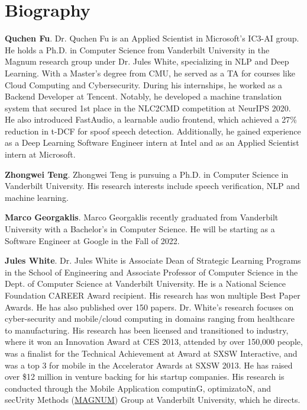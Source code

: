 \documentclass{river-journal}
\begin{document}
\nocite{*} \section*{Biography}


\medskip
\noindent
{\bf Quchen Fu}. Dr. Quchen Fu is an Applied Scientist in Microsoft's IC3-AI group. He holds a Ph.D. in Computer Science from Vanderbilt University in the Magnum research group under Dr. Jules White, specializing in NLP and Deep Learning. With a Master's degree from CMU, he served as a TA for courses like Cloud Computing and Cybersecurity. During his internships, he worked as a Backend Developer at Tencent. Notably, he developed a machine translation system that secured 1st place in the NLC2CMD competition at NeurIPS 2020. He also introduced FastAudio, a learnable audio frontend, which achieved a 27\% reduction in t-DCF for spoof speech detection. Additionally, he gained experience as a Deep Learning Software Engineer intern at Intel and as an Applied Scientist intern at Microsoft.



\medskip
\noindent
{\bf Zhongwei Teng}. Zhongwei Teng is pursuing a Ph.D. in Computer
Science in Vanderbilt University. His research interests
include speech verification, NLP and
machine learning.


\medskip
\noindent
{\bf Marco Georgaklis}. Marco Georgaklis recently graduated from Vanderbilt University with a Bachelor’s in Computer Science. He will be starting as a Software Engineer at Google in the Fall of 2022.



\medskip
\noindent
{\bf Jules White}. Dr. Jules White is Associate Dean of Strategic Learning Programs in the School of Engineering and Associate Professor of Computer Science in the Dept. of Computer Science at Vanderbilt University. He is a National Science Foundation CAREER Award recipient. His research has won multiple Best Paper Awards. He has also published over 150 papers. Dr. White’s research focuses on cyber-security and mobile/cloud computing in domains ranging from healthcare to manufacturing. His research has been licensed and transitioned to industry, where it won an Innovation Award at CES 2013, attended by over 150,000 people, was a finalist for the Technical Achievement at Award at SXSW Interactive, and was a top 3 for mobile in the Accelerator Awards at SXSW 2013. He has raised over \$12 million in venture backing for his startup companies. His research is conducted through the Mobile Application computinG, optimizatoN, and secUrity Methods (\href{http://www.magnum.io/people/jules.html}{MAGNUM}) Group at Vanderbilt University, which he directs.
\end{document}
